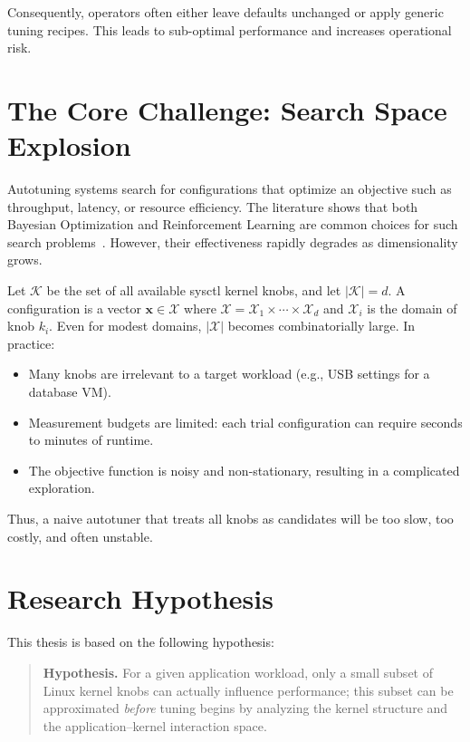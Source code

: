 Consequently, operators often either leave defaults unchanged or apply generic tuning recipes.
This leads to sub-optimal performance and increases operational risk.

\section{The Core Challenge: Search Space Explosion}\label{sec:problem-search-space}

Autotuning systems search for configurations that optimize an objective such as throughput, latency, or resource efficiency.
The literature shows that both Bayesian Optimization and Reinforcement Learning are common choices for such search problems~\cite{stun2022,autotune_survey}.
However, their effectiveness rapidly degrades as dimensionality grows.

Let $\mathcal{K}$ be the set of all available sysctl kernel knobs, and let $|\mathcal{K}| = d$.
A configuration is a vector $\mathbf{x} \in \mathcal{X}$ where
$\mathcal{X} = \mathcal{X}_1 \times \cdots \times \mathcal{X}_d$ and $\mathcal{X}_i$ is the domain of knob $k_i$.
Even for modest domains, $|\mathcal{X}|$ becomes combinatorially large.
In practice:
\begin{itemize}
    \item Many knobs are irrelevant to a target workload (e.g., USB settings for a database VM).
    \item Measurement budgets are limited: each trial configuration can require seconds to minutes of runtime.
    \item The objective function is noisy and non-stationary, resulting in a complicated exploration.
\end{itemize}

Thus, a naive autotuner that treats all knobs as candidates will be too slow, too costly, and often unstable.

\section{Research Hypothesis}\label{sec:problem-hypothesis}

This thesis is based on the following hypothesis:

\begin{quote}
\textbf{Hypothesis.} For a given application workload, only a small subset of Linux kernel knobs can actually influence performance; this subset can be approximated \emph{before} tuning begins by analyzing the kernel structure and the application--kernel interaction space.
\end{quote}

